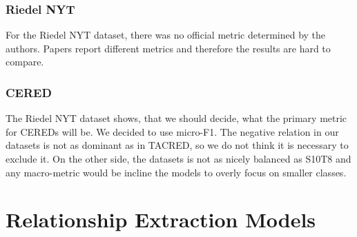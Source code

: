 \subsubsection{Riedel NYT}

For the Riedel NYT dataset, there was no official metric determined by the authors. Papers report different metrics and therefore the results are hard to compare.


\subsubsection{CERED}

The Riedel NYT dataset shows, that we should decide, what the primary metric for CEREDs will be. We decided to use micro-F1. The negative relation in our datasets is not as dominant as in TACRED, so we do not think it is necessary to exclude it. On the other side, the datasets is not as nicely balanced as S10T8 and any macro-metric would be incline the models to overly focus on smaller classes.




\section{Relationship Extraction Models}



